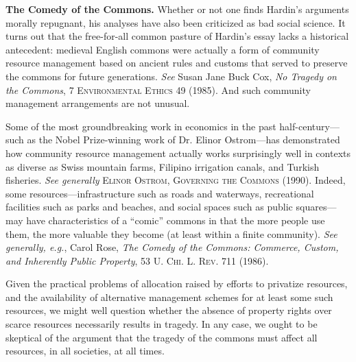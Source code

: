 \item \textbf{The Comedy of the Commons.} Whether or not one finds Hardin's
arguments morally repugnant, his analyses have also been criticized as bad
social science. It turns out that the free-for-all common pasture of Hardin's
essay lacks a historical antecedent: medieval English commons were actually a
form of community resource management based on ancient rules and customs that
served to preserve the commons for future generations. \textit{See} Susan Jane
Buck Cox, \textit{No Tragedy on the Commons}, 7 \textsc{Environmental Ethics} 49
(1985). And such community management arrangements are not unusual. 

Some of the most groundbreaking work in economics in the past
half-century---such as the Nobel Prize-winning work of Dr. Elinor Ostrom---has
demonstrated how community resource management actually works surprisingly well
in contexts as diverse as Swiss mountain farms, Filipino irrigation canals, and
Turkish fisheries. \textit{See generally} \textsc{Elinor Ostrom, Governing the
Commons} (1990). Indeed, some resources---infrastructure such as roads and
waterways, recreational facilities such as parks and beaches, and social spaces
such as public squares---may have characteristics of a ``comic'' commons in that
the more people use them, the more valuable they become (at least within a
finite community). \textit{See generally, e.g.}, Carol Rose, \textit{The Comedy
of the Commons: Commerce, Custom, and Inherently Public Property}, 53 \textsc{U.
Chi. L. Rev.} 711 (1986). 

Given the practical problems of allocation raised by efforts to privatize
resources, and the availability of alternative management schemes for at least
some such resources, we might well question whether the absence of property
rights over scarce resources necessarily results in tragedy. In any case, we
ought to be skeptical of the argument that the tragedy of the commons must
affect all resources, in all societies, at all times.

